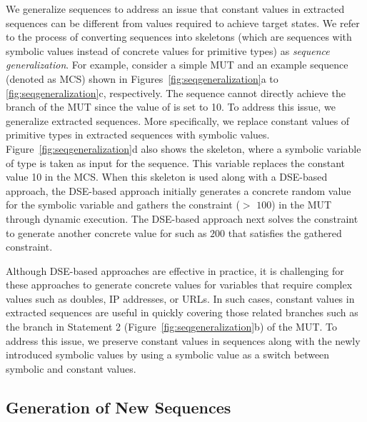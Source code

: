 \documentclass{sig-alternate}
\begin{document}
We generalize sequences to address an issue that constant values in extracted sequences can be different from values required to achieve target states. We refer to the process of converting sequences into skeletons (which are sequences with symbolic values instead of concrete values for primitive types) as \emph{sequence generalization}. For example, consider a simple MUT and an example sequence (denoted as MCS) shown in Figures~\ref{fig:seqgeneralization}a to \ref{fig:seqgeneralization}c, respectively. The sequence cannot directly achieve the  branch of the MUT since the value of  is set to 10. To address this issue, we generalize extracted sequences. More specifically, we replace constant values of primitive types in extracted sequences with symbolic values. Figure~\ref{fig:seqgeneralization}d also shows the skeleton, where a symbolic variable  of type  is taken as input for the sequence. This  variable replaces the constant value 10 in the MCS. When this skeleton is used along with a DSE-based approach, the DSE-based approach initially generates a concrete random value for the  symbolic variable and gathers the constraint ($>$ $100$) in the MUT through dynamic execution. The DSE-based approach next solves the constraint to generate another concrete value for  such as $200$ that satisfies the gathered constraint. 

Although DSE-based approaches are effective in practice, it is challenging for these approaches to generate concrete values for variables that require complex values such as doubles, IP addresses, or URLs. In such cases, constant values in extracted sequences are useful in quickly covering those related branches such as the  branch in Statement 2 (Figure~\ref{fig:seqgeneralization}b) of the MUT. To address this issue, we preserve constant values in sequences along with the newly introduced symbolic values by using a symbolic  value as a switch between symbolic and constant values.
\subsection{Generation of New Sequences}
\end{document}
